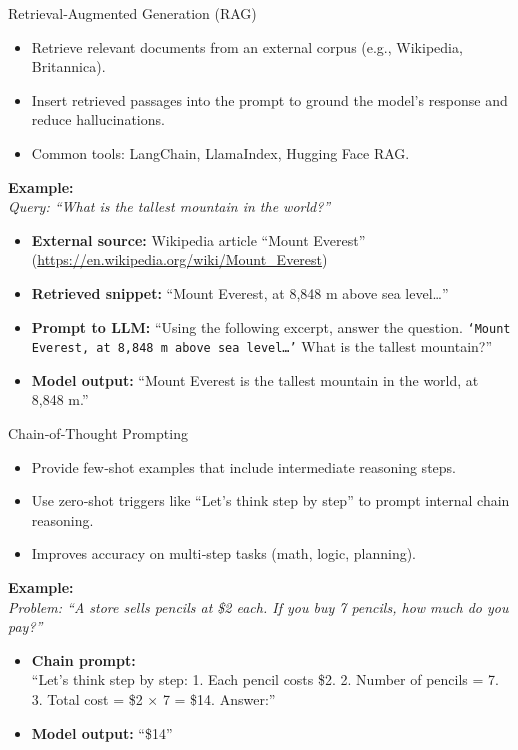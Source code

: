 \documentclass[german,10pt]{beamer}
\begin{document}
\begin{frame}{Retrieval‑Augmented Generation (RAG)}
  \begin{itemize}
    \item Retrieve relevant documents from an external corpus (e.g., Wikipedia, Britannica).
    \item Insert retrieved passages into the prompt to ground the model’s response and reduce hallucinations.
    \item Common tools: LangChain, LlamaIndex, Hugging Face RAG.
  \end{itemize}
  \vspace{1em}
  \textbf{Example:}\\
  \textit{Query: “What is the tallest mountain in the world?”}\\
  \vspace{0.5em}
  \begin{itemize}
    \item \textbf{External source:}  
      Wikipedia article “Mount Everest”  
      (\url{https://en.wikipedia.org/wiki/Mount_Everest})
    \item \textbf{Retrieved snippet:} “Mount Everest, at 8,848 m above sea level…”  
    \item \textbf{Prompt to LLM:}  
      “Using the following excerpt, answer the question.  
      \texttt{‘Mount Everest, at 8,848 m above sea level…’}  
      What is the tallest mountain?”  
    \item \textbf{Model output:} “Mount Everest is the tallest mountain in the world, at 8,848 m.”  
  \end{itemize}
\end{frame}


\begin{frame}{Chain‑of‑Thought Prompting}
  \begin{itemize}
    \item Provide few‑shot examples that include intermediate reasoning steps.
    \item Use zero‑shot triggers like “Let’s think step by step” to prompt internal chain reasoning.  
    \item Improves accuracy on multi‑step tasks (math, logic, planning).
  \end{itemize}
  \vspace{1em}
  \textbf{Example:}\\
  \textit{Problem: “A store sells pencils at \$2 each. If you buy 7 pencils, how much do you pay?”}\\
  \vspace{0.5em}
  \begin{itemize}
    \item \textbf{Chain prompt:}\\
      “Let’s think step by step:  
      1. Each pencil costs \$2.  
      2. Number of pencils = 7.  
      3. Total cost = \$2 × 7 = \$14.  
      Answer:”  
    \item \textbf{Model output:} “\$14”  
  \end{itemize}
\end{frame}
\end{document}

